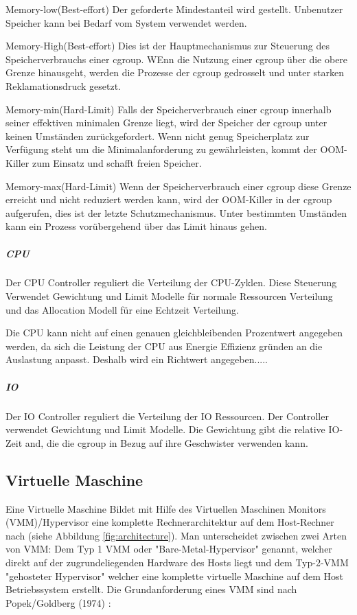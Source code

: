 Memory-low(Best-effort)
Der geforderte Mindestanteil wird gestellt. Unbenutzer Speicher kann bei Bedarf vom System verwendet werden.

Memory-High(Best-effort)
Dies ist der Hauptmechanismus zur Steuerung des Speicherverbrauchs einer cgroup. WEnn die Nutzung einer cgroup über die obere Grenze hinausgeht, werden die Prozesse der cgroup gedrosselt und unter starken Reklamationsdruck gesetzt.

Memory-min(Hard-Limit)
Falls der Speicherverbrauch einer cgroup innerhalb seiner effektiven minimalen Grenze liegt, wird der Speicher der cgroup unter keinen Umständen zurückgefordert. Wenn nicht genug Speicherplatz zur Verfügung steht um die Minimalanforderung zu gewährleisten, kommt der OOM-Killer zum Einsatz und schafft freien Speicher.

Memory-max(Hard-Limit)
Wenn der Speicherverbrauch einer cgroup diese Grenze erreicht und nicht reduziert werden kann, wird der OOM-Killer in der cgroup aufgerufen, dies ist der letzte Schutzmechanismus. Unter bestimmten Umständen kann ein Prozess vorübergehend über das Limit hinaus gehen.

\subparagraph{CPU}
Der CPU Controller reguliert die Verteilung der CPU-Zyklen. Diese Steuerung Verwendet Gewichtung und Limit Modelle für normale Ressourcen Verteilung und das Allocation Modell für eine Echtzeit Verteilung.

Die CPU kann nicht auf einen genauen gleichbleibenden Prozentwert angegeben werden, da sich die Leistung der CPU aus Energie Effizienz gründen an die Auslastung anpasst. Deshalb wird ein Richtwert angegeben.....

\subparagraph{IO}
Der IO Controller reguliert die Verteilung der IO Ressourcen. Der Controller verwendet Gewichtung und Limit Modelle. Die Gewichtung gibt die relative IO-Zeit and, die die cgroup in Bezug auf ihre Geschwister verwenden kann.

\pagebreak
\subsection{Virtuelle Maschine}
Eine Virtuelle Maschine Bildet mit Hilfe des Virtuellen Maschinen Monitors (VMM)/Hypervisor eine komplette Rechnerarchitektur auf dem Host-Rechner nach (siehe Abbildung \ref{fig:architecture}). Man unterscheidet zwischen zwei Arten von VMM: Dem Typ 1 VMM oder "Bare-Metal-Hypervisor" genannt, welcher direkt auf der zugrundeliegenden Hardware des Hosts liegt und dem Typ-2-VMM "gehosteter Hypervisor" welcher eine komplette virtuelle Maschine auf dem Host Betriebssystem erstellt. Die Grundanforderung eines VMM sind nach Popek/Goldberg (1974) \cite{Popek1974FormalArchitectures,Glatz2015Betriebssysteme} :


